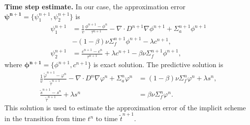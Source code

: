 \documentclass[runningheads]{llncs}
\begin{document}
\textbf{Time step estimate.}
In our case, the approximation error $\bm{\psi^{n+1}} = \{\psi^{n+1}_1, \psi^{n+1}_2\}$ is
\begin{equation}\label{14}
\begin{split}
\psi^{n+1}_1  & =  \frac{1}{v} \frac{\phi^{n+1}-\phi^n}{\tau^{n+1}} - \nabla \cdot D^{n+1} \nabla \phi^{n+1} + \Sigma_{a}^{n+1} \phi^{n+1} \\
 & - (1-\beta) \nu \Sigma^{n+1}_{f} \phi^{n+1} - \lambda  c^{n+1}, \\
\psi^{n+1}_2  & =  \frac{ c^{n+1}-c^n}{\tau^{n+1}} + \lambda c^{n+1} - \beta \nu\Sigma_{f}^{n+1} \phi^{n+1},
\end{split}
\end{equation} 
where $\bm{\phi^{n+1}} = \{ \phi^{n+1}, c^{n+1} \}$ is exact solution.
The predictive solution is 
\begin{equation}\label{15}
\begin{split}
\frac{1}{v} \frac{\widetilde\varphi^{n+1}-\varphi^n}{\widetilde\tau^{n+1}} - \nabla \cdot D^n \nabla \varphi^n + \Sigma^n_{a} \varphi^n & = (1-\beta) \nu \Sigma^n_{f} \varphi^n + \lambda s^n, \\
\frac{\widetilde s^{n+1}-s^n}{\widetilde\tau^{n+1}} + \lambda s^n &= \beta \nu\Sigma^n_{f} \varphi^n.
\end{split}
\end{equation} 
This solution is used to estimate the approximation error of the implicit scheme in the transition from time $t^n$ to time $\widetilde{t}^{n+1}$.
\end{document}
